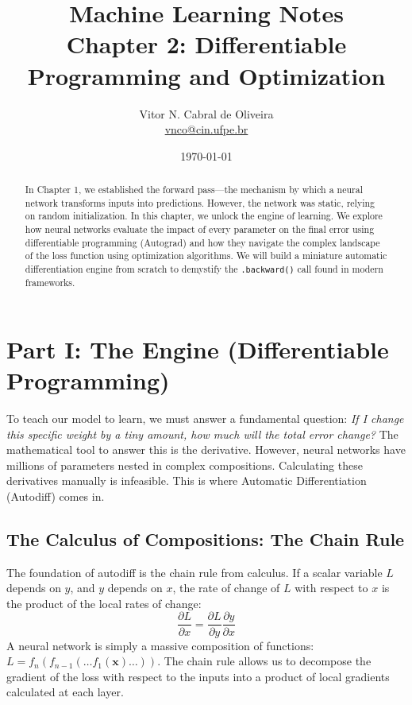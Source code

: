 \documentclass{tufte-handout}
\title{Machine Learning Notes \\ Chapter 2: Differentiable Programming and Optimization}
\author{Vitor N. Cabral de Oliveira\\ \href{mailto:vnco@cin.ufpe.br}{vnco@cin.ufpe.br}}
\date{\today}
\begin{document}
\maketitle
\begin{abstract}
    In Chapter 1, we established the forward pass—the mechanism by which a neural network transforms inputs into predictions. However, the network was static, relying on random initialization. In this chapter, we unlock the engine of learning. We explore how neural networks evaluate the impact of every parameter on the final error using differentiable programming (Autograd) and how they navigate the complex landscape of the loss function using optimization algorithms. We will build a miniature automatic differentiation engine from scratch to demystify the \texttt{.backward()} call found in modern frameworks.
\end{abstract}

\newpage
\hypersetup{linkcolor=wp-text}
\tableofcontents
\hypersetup{linkcolor=wp-primary}
\newpage

\section{Part I: The Engine (Differentiable Programming)}

To teach our model to learn, we must answer a fundamental question: \textit{If I change this specific weight by a tiny amount, how much will the total error change?} The mathematical tool to answer this is the derivative. However, neural networks have millions of parameters nested in complex compositions. Calculating these derivatives manually is infeasible. This is where Automatic Differentiation (Autodiff) comes in.

\subsection{The Calculus of Compositions: The Chain Rule}

The foundation of autodiff is the chain rule from calculus. If a scalar variable $L$ depends on $y$, and $y$ depends on $x$, the rate of change of $L$ with respect to $x$ is the product of the local rates of change:
\[
\frac{\partial L}{\partial x} = \frac{\partial L}{\partial y} \frac{\partial y}{\partial x}
\]
A neural network is simply a massive composition of functions: $L = f_n(f_{n-1}(\dots f_1(\mathbf{x})\dots))$. The chain rule allows us to decompose the gradient of the loss with respect to the inputs into a product of local gradients calculated at each layer.
\end{document}
